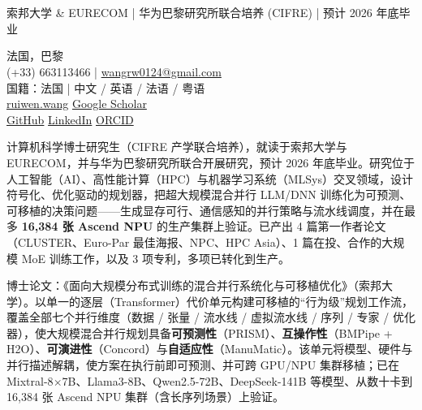 \documentclass[a4paper,11pt]{article}
\begin{document}
\begin{minipage}[t]{0.60\textwidth}
  \;\\[4pt]
  \\[3pt]
  {\small\color{TextMuted}索邦大学 \& EURECOM \;|\; 华为巴黎研究所联合培养 (CIFRE) \;|\; 预计 2026 年底毕业}
\end{minipage}
\hfill
\begin{minipage}[t]{0.38\textwidth}
  \raggedleft\small\color{TextMuted}
  法国，巴黎\\
  (+33) 663113466 \;|\; \href{mailto:wangrw0124@gmail.com}{wangrw0124@gmail.com}\\
  国籍：法国 \;|\; 中文 / 英语 / 法语 / 粤语\\
  \href{http://ruiwen.wang/}{ruiwen.wang} \;\textperiodcentered\; \href{https://scholar.google.com/citations?user=AR1nHEUAAAAJ}{Google Scholar}\\
  \href{https://github.com/wang-ruiwen}{GitHub} \;\textperiodcentered\; \href{https://www.linkedin.com/in/ruiwen-wang-ai/}{LinkedIn} \;\textperiodcentered\; \href{https://orcid.org/0009-0000-6709-5970}{ORCID}
\end{minipage}

\vspace{6pt}
\AccentRule

\small
计算机科学博士研究生（CIFRE 产学联合培养），就读于索邦大学与 EURECOM，并与华为巴黎研究所联合开展研究，预计 2026 年底毕业。研究位于人工智能（AI）、高性能计算（HPC）与机器学习系统（MLSys）交叉领域，设计符号化、优化驱动的规划器，把超大规模混合并行 LLM/DNN 训练化为可预测、可移植的决策问题——生成显存可行、通信感知的并行策略与流水线调度，并在最多 \textbf{16,384 张 Ascend NPU} 的生产集群上验证。已产出 4 篇第一作者论文（CLUSTER、Euro-Par 最佳海报、NPC、HPC Asia）、1 篇在投、合作的大规模 MoE 训练工作，以及 3 项专利，多项已转化到生产。

\small 博士论文：《面向大规模分布式训练的混合并行系统化与可移植优化》（索邦大学）。以单一的逐层（Transformer）代价单元构建可移植的“行为级”规划工作流，覆盖全部七个并行维度（数据 / 张量 / 流水线 / 虚拟流水线 / 序列 / 专家 / 优化器），使大规模混合并行规划具备\textbf{可预测性}（PRISM）、\textbf{互操作性}（BMPipe + H2O）、\textbf{可演进性}（Concord）与\textbf{自适应性}（ManuMatic）。该单元将模型、硬件与并行描述解耦，使方案在执行前即可预测、并可跨 GPU/NPU 集群移植；已在 Mixtral-8$\times$7B、Llama3-8B、Qwen2.5-72B、DeepSeek-141B 等模型、从数十卡到 16,384 张 Ascend NPU 集群（含长序列场景）上验证。
\end{document}
